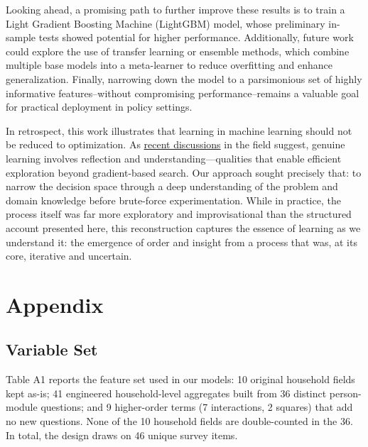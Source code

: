 \documentclass[12pt,a4paper,onecolumn]{article}
\begin{document}
Looking ahead, a promising path to further improve these results is to train a Light Gradient Boosting Machine (LightGBM) model, whose preliminary in-sample tests showed potential for higher performance. Additionally, future work could explore the use of transfer learning or ensemble methods, which combine multiple base models into a meta-learner to reduce overfitting and enhance generalization. Finally, narrowing down the model to a parsimonious set of highly informative features--without compromising performance--remains a valuable goal for practical deployment in policy settings.

In retrospect, this work illustrates that learning in machine learning should not be reduced to optimization. As \href{https://x.com/lateinteraction/status/1979612318255456353}{recent discussions} in the field suggest, genuine learning involves reflection and understanding—qualities that enable efficient exploration beyond gradient-based search. Our approach sought precisely that: to narrow the decision space through a deep understanding of the problem and domain knowledge before brute-force experimentation. While in practice, the process itself was far more exploratory and improvisational than the structured account presented here, this reconstruction captures the essence of learning as we understand it: the emergence of order and insight from a process that was, at its core, iterative and uncertain.

\clearpage




\section{Appendix}
\renewcommand{\thetable}{A\arabic{table}}
\setcounter{table}{0}

\subsection{Variable Set}

Table A1 reports the feature set used in our models: 10 original household fields kept as-is; 41 engineered household-level aggregates built from 36 distinct person-module questions; and 9 higher-order terms (7 interactions, 2 squares) that add no new questions. None of the 10 household fields are double-counted in the 36. In total, the design draws on 46 unique survey items. 
\end{document}
